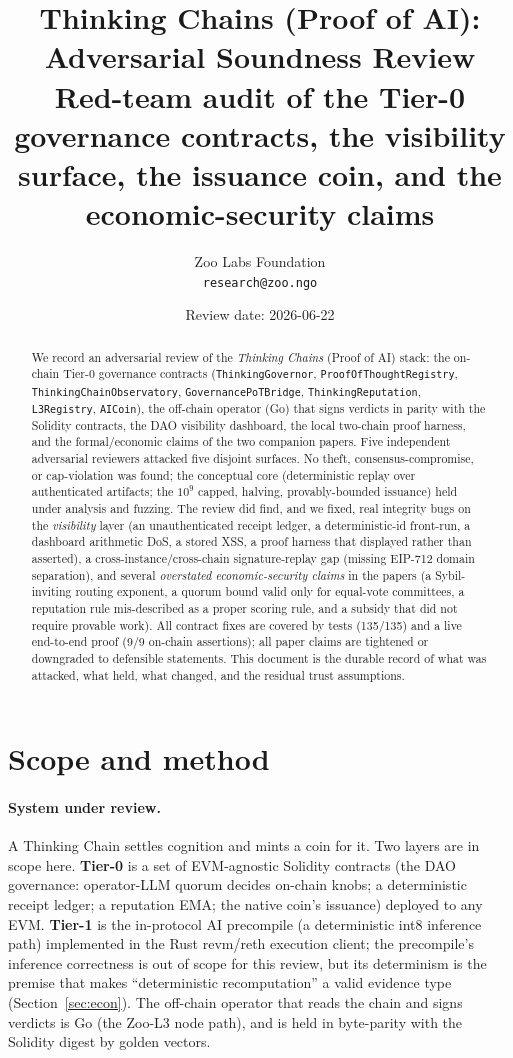 \documentclass[11pt]{article}
\title{Thinking Chains (Proof of AI): Adversarial Soundness Review\\
{\large Red-team audit of the Tier-0 governance contracts, the
visibility surface, the issuance coin, and the economic-security claims}}
\author{Zoo Labs Foundation \\ \texttt{research@zoo.ngo}}
\date{Review date: 2026-06-22}
\begin{document}
\maketitle

\begin{abstract}
We record an adversarial review of the \emph{Thinking Chains} (Proof of AI)
stack: the on-chain Tier-0 governance contracts (\texttt{ThinkingGovernor},
\texttt{ProofOfThoughtRegistry}, \texttt{ThinkingChainObservatory},
\texttt{GovernancePoTBridge}, \texttt{ThinkingReputation}, \texttt{L3Registry},
\texttt{AICoin}), the off-chain operator (Go) that signs verdicts in parity with
the Solidity contracts, the DAO visibility dashboard, the local two-chain proof
harness, and the formal/economic claims of the two companion papers. Five
independent adversarial reviewers attacked five disjoint surfaces. No theft,
consensus-compromise, or cap-violation was found; the conceptual core
(deterministic replay over authenticated artifacts; the $10^9$ capped, halving,
provably-bounded issuance) held under analysis and fuzzing. The review did find,
and we fixed, real integrity bugs on the \emph{visibility} layer (an
unauthenticated receipt ledger, a deterministic-id front-run, a dashboard
arithmetic DoS, a stored XSS, a proof harness that displayed rather than
asserted), a cross-instance/cross-chain signature-replay gap (missing EIP-712
domain separation), and several \emph{overstated economic-security claims} in the
papers (a Sybil-inviting routing exponent, a quorum bound valid only for
equal-vote committees, a reputation rule mis-described as a proper scoring rule,
and a subsidy that did not require provable work). All contract fixes are covered
by tests (135/135) and a live end-to-end proof (9/9 on-chain assertions); all
paper claims are tightened or downgraded to defensible statements. This document
is the durable record of what was attacked, what held, what changed, and the
residual trust assumptions.
\end{abstract}

\section{Scope and method}

\paragraph{System under review.} A Thinking Chain settles cognition and mints a
coin for it. Two layers are in scope here. \textbf{Tier-0} is a set of
EVM-agnostic Solidity contracts (the DAO governance: operator-LLM quorum decides
on-chain knobs; a deterministic receipt ledger; a reputation EMA; the native
coin's issuance) deployed to any EVM. \textbf{Tier-1} is the in-protocol AI
precompile (a deterministic int8 inference path) implemented in the Rust
revm/reth execution client; the precompile's inference correctness is out of
scope for this review, but its determinism is the premise that makes
``deterministic recomputation'' a valid evidence type (Section~\ref{sec:econ}).
The off-chain operator that reads the chain and signs verdicts is Go (the Zoo-L3
node path), and is held in byte-parity with the Solidity digest by golden
vectors.
\end{document}
